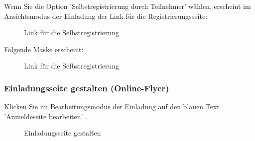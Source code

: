 Wenn Sie die Option 'Selbstregistrierung durch Teilnehmer' wählen, erscheint im Ansichtsmodus der Einladung der Link für die Registrierungsseite:

\begin{figure}[H]
\caption{Link für die Selbstregistrierung}
\end{figure}

Folgende Maske erscheint:

\begin{figure}[H]
\caption{Link für die Selbstregistrierung}
\end{figure}

\pagebreak
\subsubsection{Einladungsseite gestalten (Online-Flyer)}
\label{bkm:Ref112017101}

Klicken Sie im Bearbeitungsmodus der Einladung auf den blauen Text 'Anmeldeseite bearbeiten' . 

\begin{figure}[H]
\caption{Einladungsseite gestalten}
\end{figure}

